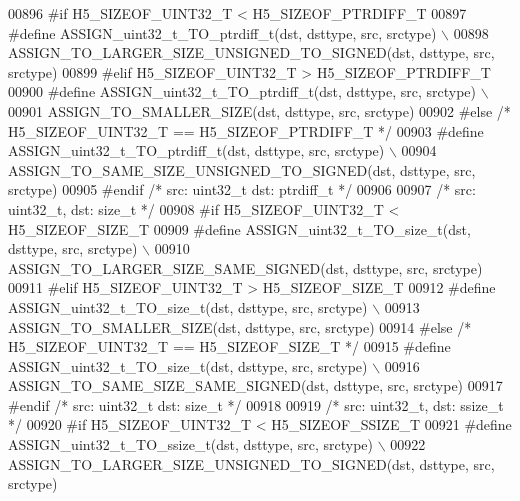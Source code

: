 \begin{DoxyCode}
00896 \textcolor{preprocessor}{#if H5\_SIZEOF\_UINT32\_T < H5\_SIZEOF\_PTRDIFF\_T}
00897 \textcolor{preprocessor}{    #define ASSIGN\_uint32\_t\_TO\_ptrdiff\_t(dst, dsttype, src, srctype) \(\backslash\)}
00898 \textcolor{preprocessor}{        ASSIGN\_TO\_LARGER\_SIZE\_UNSIGNED\_TO\_SIGNED(dst, dsttype, src, srctype)}
00899 \textcolor{preprocessor}{#elif H5\_SIZEOF\_UINT32\_T > H5\_SIZEOF\_PTRDIFF\_T}
00900 \textcolor{preprocessor}{    #define ASSIGN\_uint32\_t\_TO\_ptrdiff\_t(dst, dsttype, src, srctype) \(\backslash\)}
00901 \textcolor{preprocessor}{        ASSIGN\_TO\_SMALLER\_SIZE(dst, dsttype, src, srctype)}
00902 \textcolor{preprocessor}{#else }\textcolor{comment}{/* H5\_SIZEOF\_UINT32\_T == H5\_SIZEOF\_PTRDIFF\_T */}\textcolor{preprocessor}{}
00903 \textcolor{preprocessor}{    #define ASSIGN\_uint32\_t\_TO\_ptrdiff\_t(dst, dsttype, src, srctype) \(\backslash\)}
00904 \textcolor{preprocessor}{        ASSIGN\_TO\_SAME\_SIZE\_UNSIGNED\_TO\_SIGNED(dst, dsttype, src, srctype)}
00905 \textcolor{preprocessor}{#endif }\textcolor{comment}{/* src: uint32\_t dst: ptrdiff\_t */}\textcolor{preprocessor}{}
00906 
00907 \textcolor{comment}{/* src: uint32\_t, dst: size\_t */}
00908 \textcolor{preprocessor}{#if H5\_SIZEOF\_UINT32\_T < H5\_SIZEOF\_SIZE\_T}
00909 \textcolor{preprocessor}{    #define ASSIGN\_uint32\_t\_TO\_size\_t(dst, dsttype, src, srctype) \(\backslash\)}
00910 \textcolor{preprocessor}{        ASSIGN\_TO\_LARGER\_SIZE\_SAME\_SIGNED(dst, dsttype, src, srctype)}
00911 \textcolor{preprocessor}{#elif H5\_SIZEOF\_UINT32\_T > H5\_SIZEOF\_SIZE\_T}
00912 \textcolor{preprocessor}{    #define ASSIGN\_uint32\_t\_TO\_size\_t(dst, dsttype, src, srctype) \(\backslash\)}
00913 \textcolor{preprocessor}{        ASSIGN\_TO\_SMALLER\_SIZE(dst, dsttype, src, srctype)}
00914 \textcolor{preprocessor}{#else }\textcolor{comment}{/* H5\_SIZEOF\_UINT32\_T == H5\_SIZEOF\_SIZE\_T */}\textcolor{preprocessor}{}
00915 \textcolor{preprocessor}{    #define ASSIGN\_uint32\_t\_TO\_size\_t(dst, dsttype, src, srctype) \(\backslash\)}
00916 \textcolor{preprocessor}{        ASSIGN\_TO\_SAME\_SIZE\_SAME\_SIGNED(dst, dsttype, src, srctype)}
00917 \textcolor{preprocessor}{#endif }\textcolor{comment}{/* src: uint32\_t dst: size\_t */}\textcolor{preprocessor}{}
00918 
00919 \textcolor{comment}{/* src: uint32\_t, dst: ssize\_t */}
00920 \textcolor{preprocessor}{#if H5\_SIZEOF\_UINT32\_T < H5\_SIZEOF\_SSIZE\_T}
00921 \textcolor{preprocessor}{    #define ASSIGN\_uint32\_t\_TO\_ssize\_t(dst, dsttype, src, srctype) \(\backslash\)}
00922 \textcolor{preprocessor}{        ASSIGN\_TO\_LARGER\_SIZE\_UNSIGNED\_TO\_SIGNED(dst, dsttype, src, srctype)}

\end{DoxyCode}
